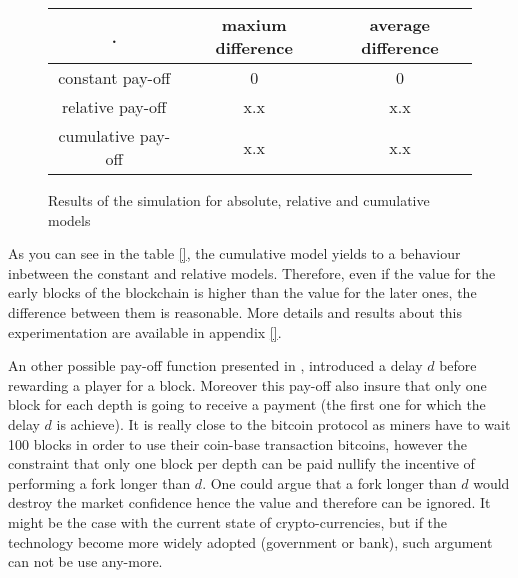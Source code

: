 \begin{figure}
\begin{tabular}{c|c|c|}
. & maxium difference & average difference   \\
\hline
constant pay-off & 0 & 0 \\
\hline
relative pay-off & x.x &  x.x \\
\hline
cumulative pay-off &  x.x &  x.x \\
\end{tabular}
\caption{Results of the simulation for absolute, relative and cumulative models}
\end{figure}

As you can see in the table \ref{}, the cumulative model yields to a behaviour inbetween the constant and relative models. Therefore, even if the value for the early blocks of the blockchain is higher than the value for the later ones, the difference between them is reasonable. More details and results about this experimentation are available in appendix \ref{}.

An other possible pay-off function presented in \cite{}, introduced a delay $d$ before rewarding a player for a block. Moreover this pay-off also insure that only one block for each depth is going to receive a payment (the first one for which the delay $d$ is achieve). It is really close to the bitcoin protocol as miners have to wait 100 blocks in order to use their coin-base transaction bitcoins, however the constraint that only one block per depth can be paid nullify the incentive of performing a fork longer than $d$. One could argue that a fork longer than $d$ would destroy the market confidence hence the value and therefore can be ignored. It might be the case with the current state of crypto-currencies, but if the technology become more widely adopted (government or bank), such argument can not be use any-more.



\fi

